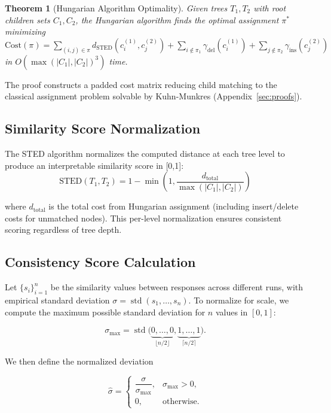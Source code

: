 \documentclass{article}
\newtheorem{theorem}{Theorem}
\begin{document}
\begin{theorem}[Hungarian Algorithm Optimality]
\label{thm:hungarian}
Given trees $T_1, T_2$ with root children sets $C_1, C_2$, the Hungarian algorithm finds the optimal assignment $\pi^*$ minimizing $\text{Cost}(\pi) = \sum_{(i,j) \in \pi} d_{\text{STED}}(c_i^{(1)}, c_j^{(2)}) + \sum_{i \notin \pi_1} \gamma_{\text{del}}(c_i^{(1)}) + \sum_{j \notin \pi_2} \gamma_{\text{ins}}(c_j^{(2)})$ in $O(\max(|C_1|, |C_2|)^3)$ time.
\end{theorem}
\vspace{-1mm}
\noindent The proof constructs a padded cost matrix reducing child matching to the classical assignment problem solvable by Kuhn-Munkres (Appendix~\ref{sec:proofs}).

\subsection{Similarity Score Normalization}

The STED algorithm normalizes the computed distance at each tree level to produce an interpretable similarity score in [0,1]:
\vspace{-2mm}
\begin{equation}
\text{STED}(T_1, T_2) = 1 - \min\left(1, \frac{d_{\text{total}}}{\max(|C_1|, |C_2|)}\right)
\end{equation}

where $d_{\text{total}}$ is the total cost from Hungarian assignment (including insert/delete costs for unmatched nodes). This per-level normalization ensures consistent scoring regardless of tree depth.

\subsection{Consistency Score Calculation}

Let $\{s_i\}_{i=1}^n$ be the similarity values between responses across different runs, with empirical standard deviation $\sigma = \operatorname{std}(s_1, \dots, s_n)$. To normalize for scale, we compute the maximum possible standard deviation for $n$ values in $[0,1]$:

\[
\sigma_{\max} = \operatorname{std}\big(\underbrace{0, \dots, 0}_{\lfloor n/2 \rfloor}, \underbrace{1, \dots, 1}_{\lceil n/2 \rceil}\big).
\]

We then define the normalized deviation

\[
\hat{\sigma} = 
\begin{cases}
\dfrac{\sigma}{\sigma_{\max}}, & \sigma_{\max} > 0, \\
0, & \text{otherwise}.
\end{cases}
\]
\end{document}
